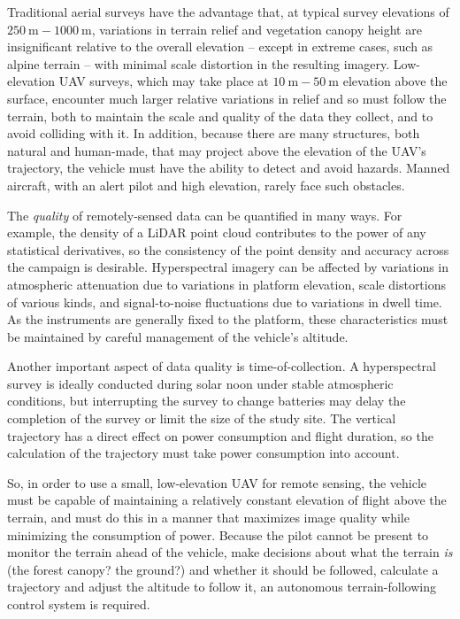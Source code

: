 \documentclass[10pt]{article}
\begin{document}
Traditional aerial surveys have the advantage that, at typical survey elevations of $\SI{250}\m-\SI{1000}\m$, variations in terrain relief and vegetation canopy height are insignificant relative to the overall elevation -- except in extreme cases, such as alpine terrain -- with minimal scale distortion in the resulting imagery. Low-elevation UAV surveys, which may take place at $\SI{10}\m-\SI{50}\m$ elevation above the surface, encounter much larger relative variations in relief and so must follow the terrain, both to maintain the scale and quality of the data they collect, and to avoid colliding with it. In addition, because there are many structures, both natural and human-made, that may project above the elevation of the UAV's trajectory, the vehicle must have the ability to detect and avoid hazards. Manned aircraft, with an alert pilot and high elevation, rarely face such obstacles.

The \emph{quality} of remotely-sensed data can be quantified in many ways. For example, the density of a LiDAR point cloud contributes to the power of any statistical derivatives, so the consistency of the point density and accuracy across the campaign is desirable. Hyperspectral imagery can be affected by variations in atmospheric attenuation due to variations in platform elevation, scale distortions of various kinds, and signal-to-noise fluctuations due to variations in dwell time. As the instruments are generally fixed to the platform, these characteristics must be maintained by careful management of the vehicle's altitude.

Another important aspect of data quality is time-of-collection. A hyperspectral survey is ideally conducted during solar noon under stable atmospheric conditions, but interrupting the survey to change batteries may delay the completion of the survey or limit the size of the study site. The vertical trajectory has a direct effect on power consumption and flight duration, so the calculation of the trajectory must take power consumption into account.

So, in order to use a small, low-elevation UAV for remote sensing, the vehicle must be capable of maintaining a relatively constant elevation of flight above the terrain, and must do this in a manner that maximizes image quality while minimizing the consumption of power. Because the pilot cannot be present to monitor the terrain ahead of the vehicle, make decisions about what the terrain \emph{is} (the forest canopy? the ground?) and whether it should be followed, calculate a trajectory and adjust the altitude to follow it, an autonomous terrain-following control system is required.
\end{document}
